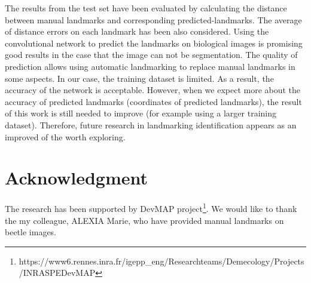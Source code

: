\documentclass[conference]{IEEEtran}
\begin{document}
The results from the test set have been evaluated by calculating the distance between manual landmarks and corresponding predicted-landmarks. The average of distance errors on each landmark has been also considered. Using the convolutional network to predict the landmarks on biological images is promising good results in the case that the image can not be segmentation. The quality of prediction allows using automatic landmarking to replace manual landmarks in some aspects.  In our case, the training dataset is limited. As a result, the accuracy of the network is acceptable. However, when we expect more about the accuracy of predicted landmarks (coordinates of predicted landmarks), the result of this work is still needed to improve (for example using a larger training dataset). Therefore, future research in landmarking identification appears as an improved of the worth exploring.
\section*{Acknowledgment}
The research has been supported by DevMAP project\footnote{https://www6.rennes.inra.fr/igepp\_eng/Research\-teams/Demecology/Projects/INRA\-SPE\-DevMAP}. We would like to thank the my colleague, ALEXIA Marie, who have provided manual landmarks on beetle images.


\end{document}
